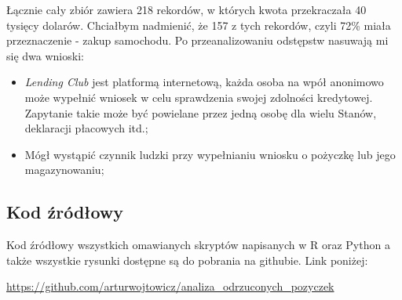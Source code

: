\documentclass[11pt]{article}
\begin{document}
Łącznie cały zbiór zawiera 218 rekordów, w których kwota przekraczała 40 tysięcy dolarów. Chciałbym nadmienić, że 157 z tych rekordów, czyli 72\% miała przeznaczenie - zakup samochodu.
Po przeanalizowaniu odstępstw nasuwają mi się dwa wnioski:

\begin{itemize}
\item \textit{Lending Club} jest platformą internetową, każda osoba na wpół anonimowo może wypełnić wniosek w celu sprawdzenia swojej zdolności kredytowej. Zapytanie takie może być powielane przez jedną osobę dla wielu Stanów, deklaracji płacowych itd.;
\item Mógł wystąpić czynnik ludzki przy wypełnianiu wniosku o pożyczkę lub jego magazynowaniu;
\end{itemize}

\subsection{Kod źródłowy}

Kod źródłowy wszystkich omawianych skryptów napisanych w R oraz Python a także wszystkie rysunki dostępne są do pobrania na githubie. Link poniżej: 
\begin{center}
\url{https://github.com/arturwojtowicz/analiza_odrzuconych_pozyczek}
\end{center}


\clearpage

\listoffigures

\clearpage

\listoftables
\end{document}
